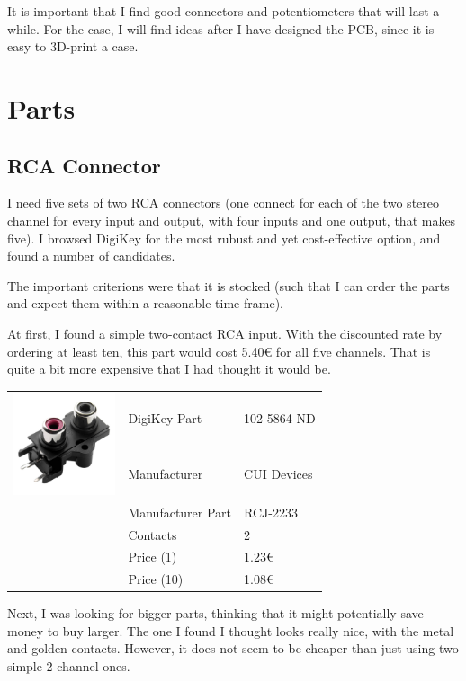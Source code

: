 \documentclass[a4paper]{article}
\begin{document}
It is important that I find good connectors and potentiometers that will last a while. For the case, I will find ideas after I have designed the PCB, since it is easy to 3D-print a case.

\section{Parts}

\subsection{RCA Connector}

I need five sets of two RCA connectors (one connect for each of the two stereo channel for every input and output, with four inputs and one output, that makes five). I browsed DigiKey for the most rubust and yet cost-effective option, and found a number of candidates.

The important criterions were  that it is stocked (such that I can order the parts and expect them within a reasonable time frame).

At first, I found a simple two-contact RCA input. With the discounted rate by ordering at least ten, this part would cost 5.40€ for all five channels. That is quite a bit more expensive that I had thought it would be.

\begin{center}
\begin{tabular}{@{}p{3cm}p{3cm}p{3cm}@{}}
\multirow{2}{3cm}{\includegraphics[width=3cm]{images/MFG_RCJ-22}}
& DigiKey Part & 102-5864-ND\\
& Manufacturer & CUI Devices\\
& Manufacturer Part & RCJ-2233\\
& Contacts & 2\\
& Price (1) & 1.23€\\
& Price (10) & 1.08€\\
\end{tabular}
\end{center}

Next, I was looking for bigger parts, thinking that it might potentially save money to buy larger. The one I found I thought looks really nice, with the metal and golden contacts. However, it does not seem to be cheaper than just using two simple 2-channel ones.
\end{document}
